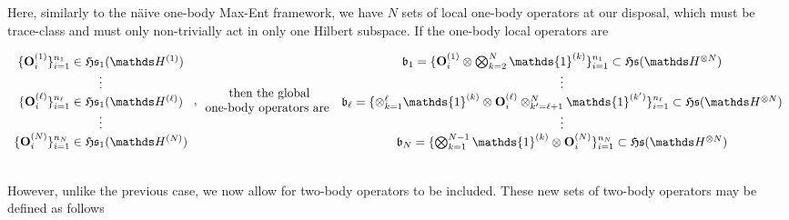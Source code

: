 \documentclass{homework}
\begin{document}
\begin{tcolorbox}[title = N\"aive two-body Max-Ent]

Here, similarly to the n\"aive one-body Max-Ent framework,
we have $N$ sets of local one-body operators at our disposal, which must be trace-class and must only non-trivially act in only one Hilbert subspace. If the one-body local operators are  

\begin{equation}
    \begin{array}{c}
            \{\mathbf{O}_i^{(1)}\}_{i=1}^{n_1}\in \mathfrak{H}\mathfrak{s}_1(\hilbert^{(1)})  \\
            \vdots \\
            \{\mathbf{O}_i^{(\ell)}\}_{i=1}^{n_{\ell}}\in \mathfrak{H}\mathfrak{s}_1(\hilbert^{(\ell)}) \\
            \vdots \\
            \{\mathbf{O}_i^{(N)}\}_{i=1}^{n_N}\in \mathfrak{H}\mathfrak{s}_1(\hilbert^{(N)})
        \end{array}, \begin{array}{c}
             \textnormal{ then the global}\\
             \textnormal{one-body operators are}
        \end{array}   \begin{array}{c}
            \mathfrak{b}_1 = \{\mathbf{O}_i^{(1)} \otimes \bigotimes_{k=2}^{N} \mathds{1}^{(k)}\}_{i=1}^{n_1}\subset \mathfrak{H}\mathfrak{s}(\hilbert^{\otimes N})\\
            \vdots \\
            \mathfrak{b}_\ell =  \{\otimes_{k=1}^{\ell} \mathds{1}^{(k)} \otimes \mathbf{O}_i^{(\ell)} \otimes_{k' = \ell + 1}^{N} \mathds{1}^{(k')}\}_{i=1}^{n_\ell}\subset \mathfrak{H}\mathfrak{s}(\hilbert^{\otimes N})\\
            \vdots \\
            \mathfrak{b}_N = \{ \bigotimes_{k=1}^{N-1} \mathds{1}^{(k)} \otimes  \mathbf{O}_i^{(N)}\}_{i=1}^{n_N}\subset \mathfrak{H}\mathfrak{s}(\hilbert^{\otimes N})
        \end{array} 
\end{equation}

\blanky\\

However, unlike the previous case, we now allow for two-body operators to be included. These new sets of two-body operators may be defined as follows


\end{tcolorbox}
\end{document}

